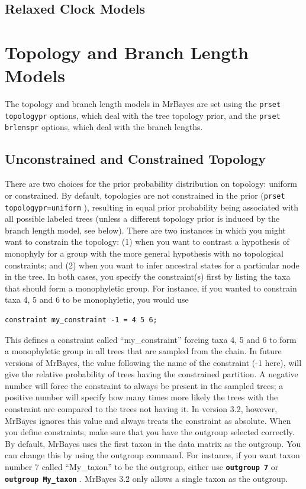 \documentclass[12pt]{book}
\newcommand{\ttt}[1]{\texttt{#1} }
\newcommand{\tb}[1]{\texttt{\textbf{#1}} }
\begin{document}
\subsection{Relaxed Clock Models}

\section{Topology and Branch Length Models}
The topology and branch length models in MrBayes are set using the \ttt{prset
topologypr} options, which deal with the tree topology prior, and the \ttt{prset
brlenspr} options, which deal with the branch lengths.

\subsection{Unconstrained and Constrained Topology}
There are two choices for the prior probability distribution on topology: uniform or
constrained. By default, topologies are not constrained in the prior (\ttt{prset
topologypr=uniform}), resulting in equal prior probability being associated with all
possible labeled trees (unless a different topology prior is induced by the branch length
model, see below). There are two instances in which you might want to constrain the
topology: (1) when you want to contrast a hypothesis of monophyly for a group with the
more general hypothesis with no topological constraints; and (2) when you want to infer
ancestral states for a particular node in the tree. In both cases, you specify the
constraint(s) first by listing the taxa that should form a monophyletic group. For instance,
if you wanted to constrain taxa 4, 5 and 6 to be monophyletic, you would use

\begin{singlespacing}
\small
\begin{verbatim}
constraint my_constraint -1 = 4 5 6;
\end{verbatim}
\normalsize
\end{singlespacing}

This defines a constraint called ``my\_constraint'' forcing taxa 4, 5 and 6 to form a
monophyletic group in all trees that are sampled from the chain. In future versions of
MrBayes, the value following the name of the constraint (-1 here), will give the relative
probability of trees having the constrained partition. A negative number will force the
constraint to always be present in the sampled trees; a positive number will specify how
many times more likely the trees with the constraint are compared to the trees not having
it. In version 3.2, however, MrBayes ignores this value and always treats the constraint as
absolute.
When you define constraints, make sure that you have the outgroup selected correctly. By
default, MrBayes uses the first taxon in the data matrix as the outgroup. You can change
this by using the outgroup command. For instance, if you want taxon number 7 called
“My\_taxon” to be the outgroup, either use \tb{outgroup 7} or \tb{outgroup My\_taxon}.
MrBayes 3.2 only allows a single taxon as the outgroup.
\end{document}
